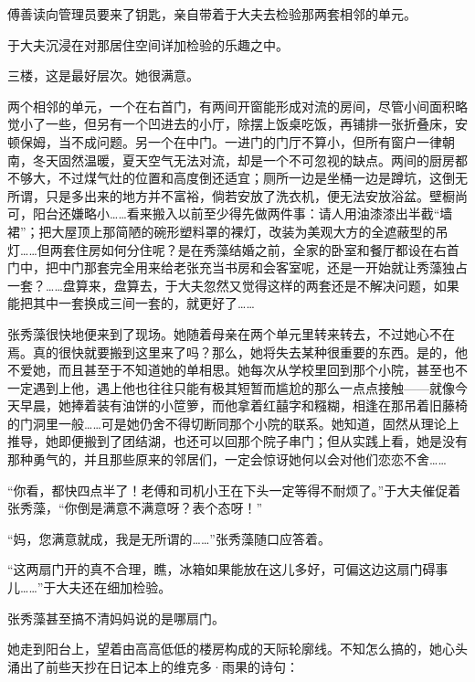 \par 傅善读向管理员要来了钥匙，亲自带着于大夫去检验那两套相邻的单元。
\par 于大夫沉浸在对那居住空间详加检验的乐趣之中。
\par 三楼，这是最好层次。她很满意。
\par 两个相邻的单元，一个在右首门，有两间开窗能形成对流的房间，尽管小间面积略觉小了一些，但另有一个凹进去的小厅，除摆上饭桌吃饭，再铺排一张折叠床，安顿保姆，当不成问题。另一个在中门。一进门的门厅不算小，但所有窗户一律朝南，冬天固然温暖，夏天空气无法对流，却是一个不可忽视的缺点。两间的厨房都不够大，不过煤气灶的位置和高度倒还适宜；厕所一边是坐桶一边是蹲坑，这倒无所谓，只是多出来的地方并不富裕，倘若安放了洗衣机，便无法安放浴盆。壁橱尚可，阳台还嫌略小……看来搬入以前至少得先做两件事：请人用油漆漆出半截“墙裙”；把大屋顶上那简陋的碗形塑料罩的裸灯，改装为美观大方的全遮蔽型的吊灯……但两套住房如何分住呢？是在秀藻结婚之前，全家的卧室和餐厅都设在右首门中，把中门那套完全用来给老张充当书房和会客室呢，还是一开始就让秀藻独占一套？……盘算来，盘算去，于大夫忽然又觉得这样的两套还是不解决问题，如果能把其中一套换成三间一套的，就更好了……
\par 张秀藻很快地便来到了现场。她随着母亲在两个单元里转来转去，不过她心不在焉。真的很快就要搬到这里来了吗？那么，她将失去某种很重要的东西。是的，他不爱她，而且甚至于不知道她的单相思。她每次从学校里回到那个小院，甚至也不一定遇到上他，遇上他也往往只能有极其短暂而尴尬的那么一点点接触——就像今天早晨，她捧着装有油饼的小笸箩，而他拿着红囍字和糨糊，相逢在那吊着旧藤椅的门洞里一般……可是她仍舍不得切断同那个小院的联系。她知道，固然从理论上推导，她即便搬到了团结湖，也还可以回那个院子串门；但从实践上看，她是没有那种勇气的，并且那些原来的邻居们，一定会惊讶她何以会对他们恋恋不舍……
\par “你看，都快四点半了！老傅和司机小王在下头一定等得不耐烦了。”于大夫催促着张秀藻，“你倒是满意不满意呀？表个态呀！”
\par “妈，您满意就成，我是无所谓的……”张秀藻随口应答着。
\par “这两扇门开的真不合理，瞧，冰箱如果能放在这儿多好，可偏这边这扇门碍事儿……”于大夫还在细加检验。
\par 张秀藻甚至搞不清妈妈说的是哪扇门。
\par 她走到阳台上，望着由高高低低的楼房构成的天际轮廓线。不知怎么搞的，她心头涌出了前些天抄在日记本上的维克多·雨果的诗句：
